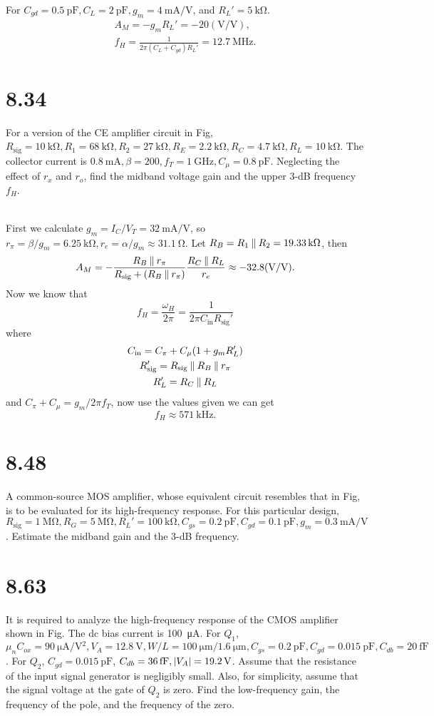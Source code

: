 \documentclass[12pt, a4paper]{article}
\begin{document}
For $C_{gd} = \SI{0.5}{\pF}, C_L = \SI{2}{\pF}, g_m = \SI{4}{\mA/\V}$, and
$R_L' = \SI{5}{\kohm}$.
\begin{gather*}
  A_{M} = -g_mR_L' = -20 (\si{\V/\V}), \\
  f_H = \frac{1}{2\pi (C_L+C_{gd})R_L'} = \SI{12.7}{\MHz}.
\end{gather*}

\section{8.34}
For a version of the CE amplifier circuit in Fig,
$R_{\text{sig}} = \SI{10}{\kohm}, R_1 = \SI{68}{\kohm}, R_2 = \SI{27}{\kohm},
R_E = \SI{2.2}{\kohm}, R_C = \SI{4.7}{\kohm}, R_L = \SI{10}{\kohm}.$
The collector current is $\SI{0.8}{\mA}, \beta = 200, f_T = \SI{1}{\GHz},
C_{\mu} = \SI{0.8}{\pF}$. Neglecting the effect of $r_x$ and $r_o$,
find the midband voltage gain and the upper 3-dB frequency $f_H$.

\Ans \\
First we calculate $g_m = I_C / V_T = \SI{32}{\mA/\V}$, so
$r_{\pi} = \beta/g_m = \SI{6.25}{\kohm},
r_e = \alpha/g_m \approx \SI{31.1}{\ohm}$.
Let $R_B = R_1 \paral R_2 = \SI{19.33}{\kohm}$, then
\[
  A_M = -\frac{R_B \paral r_{\pi}}{R_{\text{sig}}+(R_B\paral r_{\pi})}
  \frac{R_C \paral R_L}{r_e}
  \approx -32.8 (\si{\V/\V}).
\]
Now we know that
\[ f_H = \frac{\omega_H}{2\pi}
= \frac{1}{2\pi C_{\text{in}}R_{\text{sig}}'} \]
where
\begin{gather*}
  C_{\text{in}} = C_{\pi} + C_{\mu}(1+g_mR_L') \\
  R_{\text{sig}}' = R_{\text{sig}} \mathbin{\|} R_B \mathbin{\|} r_{\pi} \\
  R_{L}' = R_C \mathbin{\|} R_L
\end{gather*}
and $C_{\pi} + C_{\mu} = g_m/2\pi f_T$, now use the values given we can get
\[ f_H \approx \SI{571}{\kHz}. \]

\section{8.48}
A common-source MOS amplifier, whose equivalent circuit resembles that
in Fig, is to be evaluated for its high-frequency response. For this
particular design, $R_{\text{sig}} = \SI{1}{\Mohm}, R_G = \SI{5}{\Mohm},
R_L' = \SI{100}{\kohm}, C_{gs} = \SI{0.2}{\pF}, C_{gd} = \SI{0.1}{\pF},
g_m = \SI{0.3}{\mA/\V}$. Estimate the midband gain and the 3-dB frequency.

\section{8.63}
It is required to analyze the high-frequency response of the CMOS amplifier
shown in Fig. The dc bias current is \SI{100}{\uA}.
For $Q_1$, $\mu_nC_{ox} = \SI{90}{\uA/\V^2}, V_A = \SI{12.8}{\V},
W/L = \SI{100}{\um}/\SI{1.6}{\um}, C_{gs} = \SI{0.2}{\pF},
C_{gd} = \SI{0.015}{\pF}, C_{db} = \SI{20}{\fF}$. For $Q_2$,
$C_{gd} = \SI{0.015}{\pF}$, $C_{db} = \SI{36}{\fF}, \abs{V_A} = \SI{19.2}{\V}$.
Assume that the resistance of the input signal generator is negligibly small.
Also, for simplicity, assume that the signal voltage at the gate of $Q_2$
is zero. Find the low-frequency gain, the frequency of the pole, and the
frequency of the zero.
\end{document}

